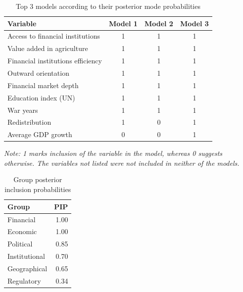 \begin{refsection}
\begin{subappendices}
    \clearpage
\begin{table}[!htbp]
  \centering
  \caption{Top 3 models according to their posterior mode probabilities}
  \label{ch3table:top3}
  \begin{threeparttable}
  \begin{tabularx}{0.9\linewidth}{lccc}
    \toprule
  Variable & Model 1 & Model 2 & Model 3 \\ 
    \midrule
  Access to financial institutions & 1 & 1 & 1 \\
  Value added in agriculture & 1 & 1 & 1 \\ 
  Financial institutions efficiency & 1 & 1 & 1 \\
  Outward orientation & 1 & 1 & 1 \\
  Financial market depth & 1 & 1 & 1 \\
  Education index (UN) & 1 & 1 & 1 \\
  War years & 1 & 1 & 1 \\
  Redistribution & 1 & 0 & 1 \\
  Average GDP growth & 0 & 0 & 1 \\
    \bottomrule
  \end{tabularx}
  \begin{tablenotes}
  \footnotesize													
  \item \textit{Note: 1 marks inclusion of the variable in the model, whereas 0 suggests otherwise. The variables not listed were not included in neither of the models.}
  \end{tablenotes}
  \end{threeparttable}
  \end{table}			
  
  \begin{table}[ht!]
  \caption{Group posterior inclusion probabilities}
  \label{ch3tab:grouppips}
  \centering
  \begin{tabular}{lr}
    \toprule
  Group & \ac{PIP} \\ 
    \midrule
    Financial & 1.00 \\ 
    Economic & 1.00 \\ 
    Political & 0.85 \\ 
    Institutional & 0.70 \\ 
    Geographical & 0.65 \\ 
    Regulatory & 0.34 \\ 
     \bottomrule
  \end{tabular}
  \end{table}
  \clearpage
  

\end{subappendices}
\end{refsection}
